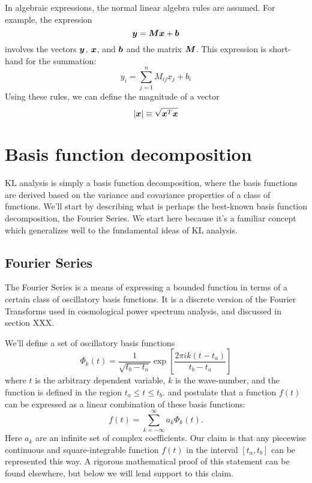 In algebraic expressions, the normal linear algebra rules are assumed.
For example, the expression 
\begin{equation}
  \boldsymbol{y} = \boldsymbol{M}\boldsymbol{x} + \boldsymbol{b}
\end{equation}
involves the vectors $\boldsymbol{y}$, $\boldsymbol{x}$, and $\boldsymbol{b}$ and the
matrix $\boldsymbol{M}$.  This expression is short-hand for the summation:
\begin{equation}
  y_i = \sum_{j=1}^{n} M_{ij} x_j + b_i
\end{equation}
Using these rules, we can define the magnitude of a vector
\begin{equation}
  |\boldsymbol{x}| \equiv \sqrt{\boldsymbol{x}^T \boldsymbol{x}}
\end{equation}

\section{Basis function decomposition}
KL analysis is simply a basis function decomposition, where the basis
functions are derived based on the variance and covariance properties
of a class of functions.  We'll start by describing what is perhaps the
best-known basis function decomposition, the Fourier Series.
We start here because it's a familiar concept which generalizes well to
the fundamental ideas of KL analysis.

\subsection{Fourier Series}
The Fourier Series is a means of expressing a bounded function in terms
of a certain class of oscillatory basis functions.  It is a discrete version
of the Fourier Transforms used in cosmological power spectrum analysis, and
discussed in section XXX.

We'll define a set of oscillatory basis functions 
\begin{equation}
  \label{eq:fourier_basis}
  \Phi_k(t) = \frac{1}{\sqrt{t_b - t_a}}
  \exp\left[\frac{2\pi i k (t-t_a)}{t_b - t_a}\right]
\end{equation}
where $t$ is the arbitrary dependent variable, $k$ is the wave-number,
and the function is defined in the region $t_a \le t \le t_b$.
and postulate that a function $f(t)$ can be expressed as a linear combination
of these basis functions:
\begin{equation}
  \label{eq:fourier_1D}
  f(t) = \sum_{k=-\infty}^\infty a_k\Phi_k(t).
\end{equation}
Here $a_k$ are an infinite set of complex coefficients.  Our claim is that
any piecewise continuous and square-integrable function $f(t)$ in the
interval $[t_a, t_b]$ can be represented this way.
A rigorous mathematical proof
of this statement can be found elsewhere, but below we will lend support
to this claim.

